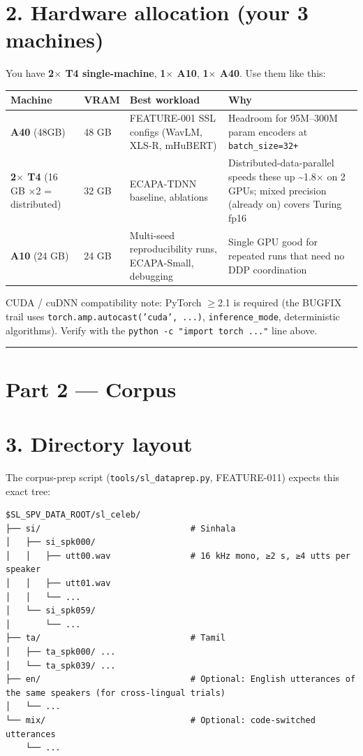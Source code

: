 \documentclass[10pt,a4paper]{article}
\renewcommand{\arraystretch}{1.15}
\begin{document}
\section*{2. Hardware allocation (your 3 machines)}

You have \textbf{2$\times$ T4 single-machine}, \textbf{1$\times$ A10}, \textbf{1$\times$ A40}. Use them like this:

\begin{center}
\small
\renewcommand{\arraystretch}{1.25}
\begin{tabularx}{\textwidth}{|Y|Y|Y|Y|}
\hline
Machine & VRAM & Best workload & Why \\
\hline
\textbf{A40} (48GB) & 48 GB & FEATURE-001 SSL configs (WavLM, XLS-R, mHuBERT) & Headroom for 95M--300M param encoders at \texttt{batch\_size=32+} \\
\hline
\textbf{2$\times$ T4} (16 GB $\times$2 = distributed) & 32 GB & ECAPA-TDNN baseline, ablations & Distributed-data-parallel speeds these up \textasciitilde{}1.8$\times$ on 2 GPUs; mixed precision (already on) covers Turing fp16 \\
\hline
\textbf{A10} (24 GB) & 24 GB & Multi-seed reproducibility runs, ECAPA-Small, debugging & Single GPU good for repeated runs that need no DDP coordination \\
\hline
\end{tabularx}
\end{center}

CUDA / cuDNN compatibility note: PyTorch $\geq$2.1 is required (the BUGFIX trail uses \texttt{torch.amp.autocast('cuda', ...)}, \texttt{inference\_mode}, deterministic algorithms). Verify with the \texttt{python -c "import torch ..."} line above.

\vspace{0.5em}\hrule\vspace{0.5em}

\section*{Part 2 --- Corpus}

\section*{3. Directory layout}

The corpus-prep script (\texttt{tools/sl\_dataprep.py}, FEATURE-011) expects this exact tree:


\begin{Verbatim}[fontsize=\small,frame=single,framesep=4pt]
$SL_SPV_DATA_ROOT/sl_celeb/
├── si/                              # Sinhala
│   ├── si_spk000/
│   │   ├── utt00.wav                # 16 kHz mono, ≥2 s, ≥4 utts per speaker
│   │   ├── utt01.wav
│   │   └── ...
│   └── si_spk059/
│       └── ...
├── ta/                              # Tamil
│   ├── ta_spk000/ ...
│   └── ta_spk039/ ...
├── en/                              # Optional: English utterances of the same speakers (for cross-lingual trials)
│   └── ...
└── mix/                             # Optional: code-switched utterances
    └── ...
\end{Verbatim}
\end{document}
